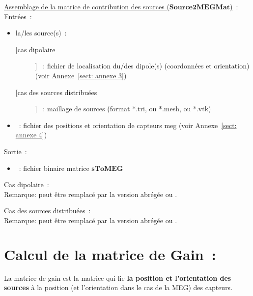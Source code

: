 \bigskip

\noindent
\underline{Assemblage de la matrice de contribution des sources ($\mathbf{Source2MEGMat}$)}~:\\
Entrées~:
\begin{itemize}
    \item la/les source(s)~:
    \begin{description}
        \item [[cas dipolaire]] ~: fichier de localisation du/des dipole(s) (coordonnées et orientation) (voir Annexe~\ref{sect: annexe 3}) 
        \item [[cas des sources distribuées]] ~: maillage de sources (format *.tri, ou *.mesh, ou *.vtk)
    \end{description}
    \item {}~: fichier des positions et orientation de capteurs meg (voir Annexe~\ref{sect: annexe 4})
\end{itemize}
Sortie~: 
\begin{itemize}
    \item {}~: fichier binaire matrice $\mathbf{sToMEG}$
\end{itemize}

\medskip

\noindent
Cas dipolaire~:\\
\noindent
{}
\medskip
Remarque:  peut être remplacé par la version abrégée  ou .

\medskip

\noindent
Cas des sources distribuées~:\\
\noindent
{}
\medskip
Remarque:  peut être remplacé par la version abrégée  ou .

\section{Calcul de la matrice de Gain~:}
\label{sect: command gain}

La matrice de gain est la matrice qui lie \textbf{la position et l'orientation des sources} à la position (et l'orientation dans le cas
de la MEG) des capteurs. 

